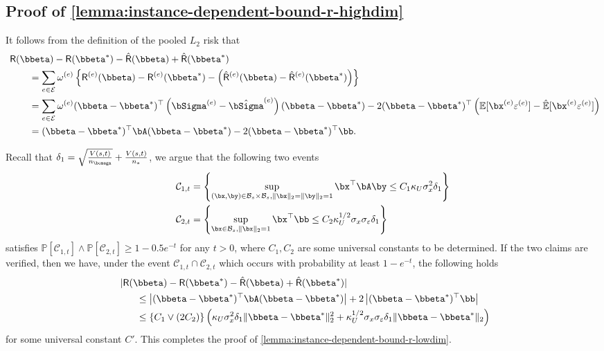 \documentclass[10pt]{article}
\numberwithin{equation}{section}
\begin{document}
\subsection{Proof of \cref{lemma:instance-dependent-bound-r-highdim}}
\label{subsec:proof-instance-dependent-bound-r-highdim}

It follows from the definition of the pooled $L_2$ risk that
\begin{align*}
&~\mathsf{R}(\bbeta) - \mathsf{R}(\bbeta^*) - \hat{\mathsf{R}}(\bbeta) + \hat{\mathsf{R}}(\bbeta^*) \\
&~~~~~~~  = \sum_{e\in \mathcal{E}} \omega^{(e)} \left\{\mathsf{R}^{(e)}(\bbeta) - \mathsf{R}^{(e)}(\bbeta^*) - \left(\hat{\mathsf{R}}^{(e)}(\bbeta) - \hat{\mathsf{R}}^{(e)}(\bbeta^*)\right) \right\}\\
&~~~~~~~  = \sum_{e\in \mathcal{E}} \omega^{(e)} (\bbeta - \bbeta^*)^\top \left(\bSigma^{(e)} - \hat{\bSigma}^{(e)}\right) (\bbeta - \bbeta^*) - 2(\bbeta - \bbeta^*)^\top \left(\mathbb{E}[\bx^{(e)}\varepsilon^{(e)}] - \hat{\mathbb{E}}[\bx^{(e)} \varepsilon^{(e)}]\right) \\
&~~~~~~~  = (\bbeta - \bbeta^*)^\top \bA (\bbeta - \bbeta^*) - 2(\bbeta - \bbeta^*)^\top \bb.
\end{align*}

Recall that $\delta_1 = \sqrt{\frac{V(s,t)}{n_{\bomega}}} + \frac{V(s,t)}{n_*}$, we argue that the following two events
\begin{align*}
    \mathcal{C}_{1,t} &= \left\{ \sup_{(\bx, \by)\in \mathcal{B}_s \times \mathcal{B}_s, \|\bx\|_2=\|\by\|_2=1} \bx^\top \bA \by \le C_1 \kappa_U \sigma_x^2 \delta_1\right\} \\
    \qquad \mathcal{C}_{2,t} &= \left\{ \sup_{\bx \in \mathcal{B}_s, \|\bx\|_2=1} \bx^\top \bb \le C_2 \kappa_U^{1/2} \sigma_x\sigma_\varepsilon \delta_1\right\}
\end{align*} satisfies $\mathbb{P}[\mathcal{C}_{1,t}] \land \mathbb{P}[\mathcal{C}_{2,t}] \ge 1-0.5 e^{-t}$ for any $t>0$, where $C_1, C_2$ are some universal constants to be determined. If the two claims are verified, then we have, under the event $\mathcal{C}_{1,t} \cap \mathcal{C}_{2,t}$ which occurs with probability at least $1-e^{-t}$, the following holds
\begin{align*}
&~|\mathsf{R}(\bbeta) - \mathsf{R}(\bbeta^*) - \hat{\mathsf{R}}(\bbeta) + \hat{\mathsf{R}}(\bbeta^*)| \\
&~~~~~~ \le \left|(\bbeta - \bbeta^*)^\top \bA (\bbeta - \bbeta^*)\right| + 2\left|(\bbeta - \bbeta^*)^\top \bb \right| \\
&~~~~~~ \le \{C_1 \lor (2C_2) \}\left(\kappa_U \sigma_x^2 \delta_1 \|\bbeta - \bbeta^*\|_2^2 + \kappa_U^{1/2} \sigma_x\sigma_\varepsilon \delta_1 \|\bbeta - \bbeta^*\|_2\right)
\end{align*} for some universal constant $C'$. This completes the proof of \cref{lemma:instance-dependent-bound-r-lowdim}.
\end{document}
